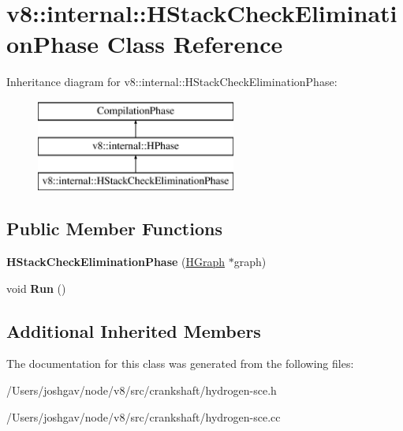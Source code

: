 \hypertarget{classv8_1_1internal_1_1_h_stack_check_elimination_phase}{}\section{v8\+:\+:internal\+:\+:H\+Stack\+Check\+Elimination\+Phase Class Reference}
\label{classv8_1_1internal_1_1_h_stack_check_elimination_phase}
Inheritance diagram for v8\+:\+:internal\+:\+:H\+Stack\+Check\+Elimination\+Phase\+:\begin{figure}[H]
\begin{center}
\leavevmode
\includegraphics[height=3.000000cm]{classv8_1_1internal_1_1_h_stack_check_elimination_phase}
\end{center}
\end{figure}
\subsection*{Public Member Functions}
\begin{DoxyCompactItemize}
\item 
{\bfseries H\+Stack\+Check\+Elimination\+Phase} (\hyperlink{classv8_1_1internal_1_1_h_graph}{H\+Graph} $\ast$graph)\hypertarget{classv8_1_1internal_1_1_h_stack_check_elimination_phase_a828611624c412eebc12e4c327e7f5ee2}{}\label{classv8_1_1internal_1_1_h_stack_check_elimination_phase_a828611624c412eebc12e4c327e7f5ee2}

\item 
void {\bfseries Run} ()\hypertarget{classv8_1_1internal_1_1_h_stack_check_elimination_phase_a33292431e2c081975c7327b62a636c4b}{}\label{classv8_1_1internal_1_1_h_stack_check_elimination_phase_a33292431e2c081975c7327b62a636c4b}

\end{DoxyCompactItemize}
\subsection*{Additional Inherited Members}


The documentation for this class was generated from the following files\+:\begin{DoxyCompactItemize}
\item 
/\+Users/joshgav/node/v8/src/crankshaft/hydrogen-\/sce.\+h\item 
/\+Users/joshgav/node/v8/src/crankshaft/hydrogen-\/sce.\+cc\end{DoxyCompactItemize}
